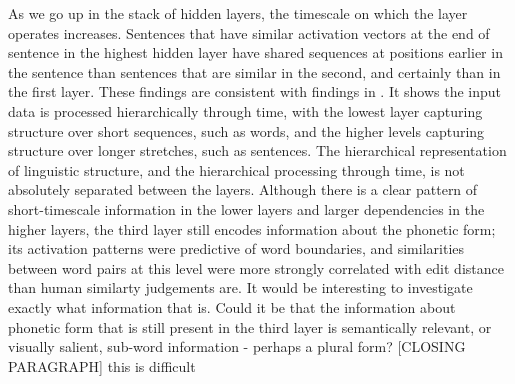 As we go up in the stack of hidden layers, the timescale on which the layer operates increases. Sentences that have similar activation vectors at the end of sentence in the highest hidden layer have shared sequences at positions earlier in the sentence than sentences that are similar in the second, and certainly than in the first layer. These findings are consistent with findings in . It shows the input data is processed hierarchically through time, with the lowest layer capturing structure over short sequences, such as words, and the higher levels capturing structure over longer stretches, such as sentences. 
The hierarchical representation of linguistic structure, and the hierarchical processing through time, is not absolutely separated between the layers. Although there is a clear pattern of short-timescale information in the lower layers and larger dependencies in the higher layers, the third layer still encodes information about the phonetic form; its activation patterns were predictive of word boundaries, and similarities between word pairs at this level were more strongly correlated with edit distance than human similarty judgements are. It would be interesting to investigate exactly what information that is. Could it be that the information about phonetic form that is still present in the third layer is semantically relevant, or visually salient, sub-word information - perhaps a plural form?
[CLOSING PARAGRAPH] this is difficult